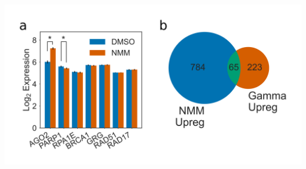 \documentclass[12pt,a4paper,]{report}
\let\origfigure=\figure
\let\endorigfigure=\endfigure
\renewenvironment{figure}[1][2] {
    \expandafter\origfigure\expandafter[H]
} {
    \endorigfigure
}
\begin{document}
\begin{figure}[htbp]
\centering
\includegraphics[width=\textwidth,height=562pt,keepaspectratio]{chapter_5/figures/dna_damage_response.png}
\caption[NMM does not activate DNA damage response]{\textbf{NMM   does   not   activate   DNA   damage   response}   \textbf{a)}   Barplot   showing   normalised   log2   expression   of   seven   DNA   damage   responsive   genes:   AGO2,   PARP1,   RPA1E,   BRCA1,   GRG,   RAD51,   and   RAD17,   in   the   presence   and   absence   of   NMM.   Errorbars   are   standard   errors   calculated   by   \texttt{puma} .   Asterisks   denote   significant   results.   \textbf{b)}   Venn   diagram   showing   the   overlap   between   NMM   upregulated   genes   and   genes   upregulated   in   response   to   gamma   irradiation.   \label{damage}}
\end{figure}
\end{document}

